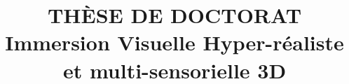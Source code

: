

\title{
	THÈSE DE DOCTORAT\\
	\textbf{Immersion Visuelle Hyper-réaliste et multi-sensorielle 3D}
}

\author{}
\date{}

	\makeatletter
	\makeatother 

	\makeatletter
	\renewenvironment{thebibliography}[1]
     	{\part*{\bibname}
     	 \@mkboth{\MakeUppercase\bibname}{\MakeUppercase\bibname}%
    	  \list{\@biblabel{\@arabic\c@enumiv}}%
     	      {\settowidth\labelwidth{\@biblabel{#1}}%
        	    \leftmargin\labelwidth
            	\advance\leftmargin\labelsep
            	\@openbib@code
            	\usecounter{enumiv}%
            	\let\p@enumiv\@empty
            	\renewcommand\theenumiv{\@arabic\c@enumiv}}%
      	\sloppy
      	\clubpenalty4000
      	\@clubpenalty \clubpenalty
      	\widowpenalty4000%
      	\sfcode`\.\@m}
     	{\def\@noitemerr
       	{\@latex@warning{Empty `thebibliography' environment}}%
      	\endlist}
	\makeatother




	\maketitle
	\newpage
	
	\tableofcontents	%
	\listoffigures		%
	\listoftables		%
	
				\newpage		%
		
		
%		
%		

	\newpage
	

	
	
	
%	

